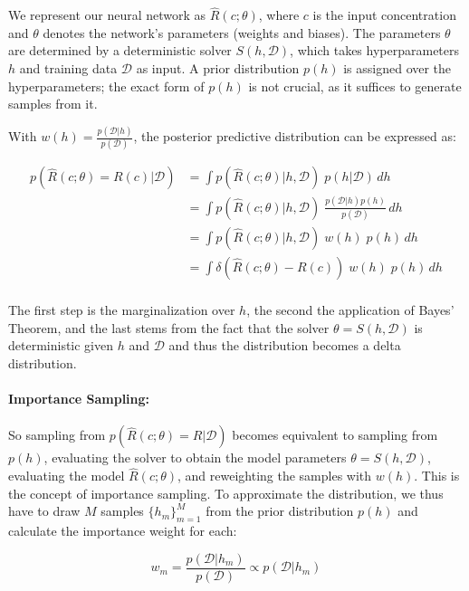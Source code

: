 \documentclass{article}
\begin{document}
We represent our neural network as $\hat{R}(c; \theta)$, where $c$ is the input concentration and $\theta$ denotes the network's parameters (weights and biases). The parameters $\theta$ are determined by a deterministic solver $S(h, \mathcal{D})$, which takes hyperparameters $h$ and training data $\mathcal{D}$ as input. A prior distribution $p(h)$ is assigned over the hyperparameters; the exact form of $p(h)$ is not crucial, as it suffices to generate samples from it.

With $w(h) = \frac{p(\mathcal{D} | h)}{p(\mathcal{D})}$, the posterior predictive distribution can be expressed as:

\begin{align*}
p(\hat{R}(c; \theta) = R(c)| \mathcal{D}) &= \int p(\hat{R}(c; \theta) | h, \mathcal{D})\; p(h | \mathcal{D}) \, dh \\
                                          &= \int p(\hat{R}(c; \theta) | h, \mathcal{D})\; \frac{p(\mathcal{D} | h) p(h)}{p(\mathcal{D})} \, dh \\
                                          &= \int p(\hat{R}(c; \theta) | h, \mathcal{D})\; w(h)\; p(h) \, dh \\
                                          &= \int \delta(\hat{R}(c; \theta) - R(c))\; w(h)\; p(h) \, dh \\
\end{align*}

The first step is the marginalization over $h$, the second the application of Bayes' Theorem, and the last stems from the fact that the solver $\theta = S(h, \mathcal{D})$ is deterministic given $h$ and $\mathcal{D}$ and thus the distribution becomes a delta distribution.


\paragraph{Importance Sampling:}

So sampling from $p(\hat{R}(c; \theta) = R| \mathcal{D})$ becomes equivalent to sampling from $p(h)$, evaluating the solver to obtain the model parameters $\theta = S(h, \mathcal{D})$, evaluating the model $\hat{R}(c; \theta)$, and reweighting the samples with $w(h)$. This is the concept of importance sampling. To approximate the distribution, we thus have to draw $M$ samples $\{h_m\}_{m=1}^M$ from the prior distribution $p(h)$ and calculate the importance weight for each:

\begin{equation*}
w_m = \frac{p(\mathcal{D} | h_m)}{p(\mathcal{D})} \propto p(\mathcal{D} | h_m)
\end{equation*}
\end{document}
